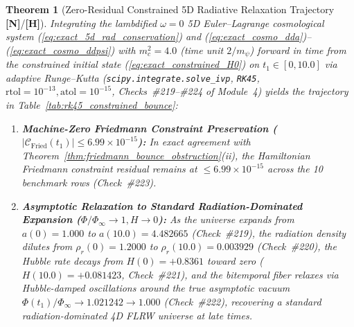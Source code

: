 \documentclass[11pt,a4paper]{article}
\newcommand{\catH}{\textbf{\textcolor{orange!85!black}{[H]}}}
\newcommand{\catN}{\textbf{\textcolor{teal!75!black}{[N]}}}
\newtheorem{theorem}{Theorem}[section]
\theoremstyle{definition}
\theoremstyle{remark}
\begin{document}
\begin{theorem}[Zero-Residual Constrained 5D Radiative Relaxation Trajectory \catN/\catH]
\label{thm:constrained_cosmo_rk45}
Integrating the lambdified $\omega = 0$ 5D Euler--Lagrange cosmological system (\ref{eq:exact_5d_rad_conservation}) and (\ref{eq:exact_cosmo_dda})--(\ref{eq:exact_cosmo_ddpsi}) with $m_c^2 = 4.0$ (time unit $2/m_{\psi}$) forward in time from the constrained initial state (\ref{eq:exact_constrained_H0}) on $t_1 \in [0, 10.0]$ via adaptive Runge--Kutta (\texttt{scipy.integrate.solve\_ivp}, \texttt{RK45}, $\text{rtol} = 10^{-13}, \text{atol} = 10^{-15}$, Checks~\#219--\#224 of Module~4) yields the trajectory in Table~\ref{tab:rk45_constrained_bounce}:
\begin{enumerate}
  \item[\textnormal{(i)}] \textbf{Machine-Zero Friedmann Constraint Preservation ($|\mathcal{C}_{\text{Fried}}(t_1)| \le 6.99 \times 10^{-15}$):} In exact agreement with Theorem~\ref{thm:friedmann_bounce_obstruction}(ii), the Hamiltonian Friedmann constraint residual remains at $\le 6.99 \times 10^{-15}$ across the 10 benchmark rows (Check~\#223).
  \item[\textnormal{(ii)}] \textbf{Asymptotic Relaxation to Standard Radiation-Dominated Expansion ($\Phi/\Phi_{\infty} \to 1, H \to 0$):} As the universe expands from $a(0) = 1.000$ to $a(10.0) = 4.482665$ (Check~\#219), the radiation density dilutes from $\rho_r(0) = 1.2000$ to $\rho_r(10.0) = 0.003929$ (Check~\#220), the Hubble rate decays from $H(0) = +0.8361$ toward zero ($H(10.0) = +0.081423$, Check~\#221), and the bitemporal fiber relaxes via Hubble-damped oscillations around the true asymptotic vacuum $\Phi(t_1)/\Phi_{\infty} \to 1.021242 \to 1.000$ (Check~\#222), recovering a standard radiation-dominated 4D FLRW universe at late times.
\end{enumerate}
\end{theorem}
\end{document}
